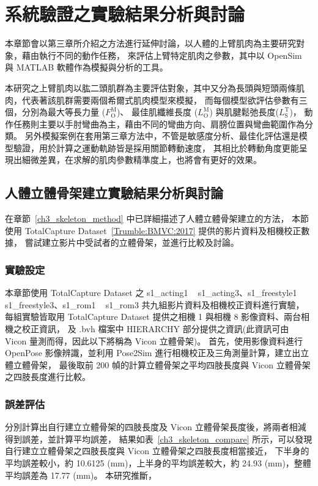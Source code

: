 \chapter{系統驗證之實驗結果分析與討論}
\fontsize{12pt}{18pt}\selectfont %

本章節會以第三章所介紹之方法進行延伸討論，以人體的上臂肌肉為主要研究對象，藉由執行不同的動作任務，
來評估上臂特定肌肉之參數，其中以 OpenSim 與 MATLAB 軟體作為模擬與分析的工具。

本研究之上臂肌肉以肱二頭肌群為主要評估對象，其中又分為長頭與短頭兩條肌肉，代表著該肌群需要兩個希爾式肌肉模型來模擬，
而每個模型欲評估參數有三個，分別為最大等長力量 ($F^\mathrm{M}_\mathrm{O}$)、
最佳肌纖維長度 ($L^\mathrm{M}_\mathrm{O}$) 與肌腱鬆弛長度($L^\mathrm{T}_\mathrm{S}$)，
動作任務則主要以手肘彎曲為主，藉由不同的彎曲方向、肩膀位置與彎曲範圍作為分類。
另外模擬案例在套用第三章方法中，不管是敏感度分析、最佳化評估還是模型驗證，用於計算之運動軌跡皆是採用關節轉動速度，
其相比於轉動角度更能呈現出細微差異，在求解的肌肉參數精準度上，也將會有更好的效果。

\section{人體立體骨架建立實驗結果分析與討論}\label{ch4_skeleton_exp}
在章節~\ref{ch3_skeleton_method} 中已詳細描述了人體立體骨架建立的方法，
本節使用 TotalCapture Dataset~\ref{Trumble:BMVC:2017} 提供的影片資料及相機校正數據，
嘗試建立影片中受試者的立體骨架，並進行比較及討論。

\subsection{實驗設定}
本章節使用 TotalCapture Dataset 之 s1\_acting1 ~ s1\_acting3、s1\_freestyle1 ~ s1\_freestyle3、s1\_rom1 ~ s1\_rom3 共九組影片資料及相機校正資料進行實驗，
每組實驗皆取用 TotalCapture Dataset 提供之相機 1 與相機 8 影像資料、兩台相機之校正資訊，
及 .bvh 檔案中 HIERARCHY 部分提供之資訊(此資訊可由 Vicon 量測而得，因此以下將稱為 Vicon 立體骨架)。
首先，使用影像資料進行 OpenPose 影像辨識，並利用 Pose2Sim 進行相機校正及三角測量計算，建立出立體立體骨架，
最後取前 200 幀的計算立體骨架之平均四肢長度與 Vicon 立體骨架之四肢長度進行比較。

\subsection{誤差評估}
分別計算出自行建立立體骨架的四肢長度及 Vicon 立體骨架長度後，將兩者相減得到誤差，並計算平均誤差，
結果如表~\ref{ch3_skeleton_compare} 所示，可以發現自行建立立體骨架之四肢長度與 Vicon 立體骨架之四肢長度相當接近，
下半身的平均誤差較小，約 10.6125 (mm)，上半身的平均誤差較大，約 24.93 (mm)，整體平均誤差為 17.77 (mm)。
本研究推斷，

